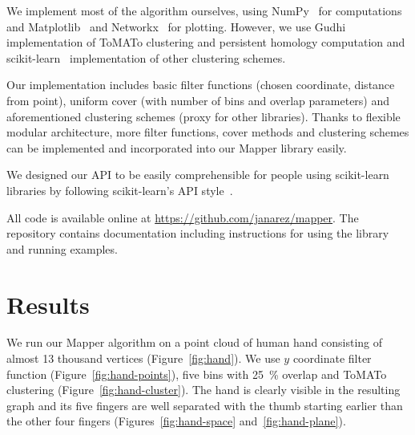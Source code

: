 \documentclass{article}
\begin{document}
We implement most of the algorithm ourselves, using NumPy~\cite{numpy} for computations and Matplotlib~\cite{matplotlib} and Networkx~\cite{networkx} for plotting.
However, we use Gudhi~\cite{gudhi} implementation of ToMATo clustering and persistent homology computation and scikit-learn~\cite{scikit} implementation of other clustering schemes.

Our implementation includes basic filter functions (chosen coordinate, distance from point), uniform cover (with number of bins and overlap parameters) and aforementioned clustering schemes (proxy for other libraries).
Thanks to flexible modular architecture, more filter functions, cover methods and clustering schemes can be implemented and incorporated into our Mapper library easily.

We designed our API to be easily comprehensible for people using scikit-learn libraries by following scikit-learn's API style~\cite{scikitAPI}.

All code is available online at \url{https://github.com/janarez/mapper}.
The repository contains documentation including instructions for using the library and running examples.

\section{Results}\label{sec:res}

We run our Mapper algorithm on a point cloud of human hand consisting of almost 13 thousand vertices (Figure~\ref{fig:hand}).
We use $y$ coordinate filter function (Figure~\ref{fig:hand-points}), five bins with 25~\% overlap and ToMATo clustering (Figure~\ref{fig:hand-cluster}).
The hand is clearly visible in the resulting graph and its five fingers are well separated with the thumb starting earlier than the other four fingers (Figures~\ref{fig:hand-space} and~\ref{fig:hand-plane}).
\end{document}
